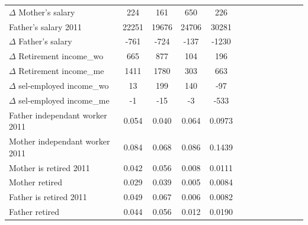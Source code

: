 \begin{table}
{\begin{tabular}{lcccccccccccc}
    $\Delta$ Mother's salary	              &  224              	&  161    	 	&650                                	          	&226                    \\     
    Father's salary 2011	                  &   22251           	& 19676     	&24706                                  	      	&30281	                \\       
    $\Delta$ Father's salary	              &  -761             	& -724    	 	&-137                                   	      	&-1230	                \\       
    $\Delta$ Retirement income_wo	          & 665               	& 877     	 	&104                                	          	&196                    \\         
    $\Delta$ Retirement income_me	          & 1411              	& 1780     	 	&303                                	          	&663                    \\         
    $\Delta$ sel-employed income_wo	    & 13                	& 199   	  	&140                                	          	&-97                    \\         
    $\Delta$ sel-employed income_me	    & -1                	& -15   	  	&-3                                 	          	&-533                    \\
    \midrule             
    Father independant worker 2011	        &   0.054           	& 0.040	     	&0.064                               	          	&0.0973                 \\        
    Mother independant worker 2011	        &   0.084           	& 0.068	     	&0.086                               	          	&0.1439                 \\        
    \midrule
    Mother is retired 2011	                &   0.042             & 0.056	     	&0.008                               	          	&0.0111                 \\        
    Mother retired 	                        &  0.029             	& 0.039	     	&0.005                               	          	&0.0084                 \\        
    Father is retired 2011	                &   0.049             & 0.067	     	&0.006                               	          	&0.0082                 \\        
    Father retired 	                        &  0.044             	& 0.056	     	&0.012                               	          	&0.0190                 \\        

\end{tabular}}
\end{table}
